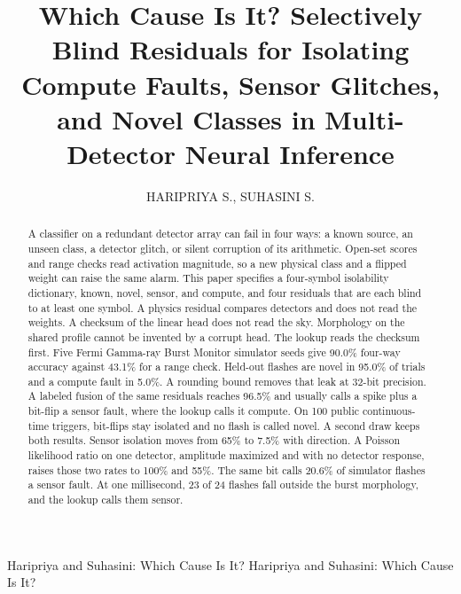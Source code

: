 \documentclass{ieeeaccess}
\begin{document}
\title{Which Cause Is It? Selectively Blind Residuals for Isolating Compute Faults, Sensor Glitches, and Novel Classes in Multi-Detector Neural Inference}

\author{\uppercase{Haripriya S.}, \uppercase{Suhasini S.}}
\address[1]{School of Computer Science and Engineering, Vellore Institute of Technology, Chennai 600127, India}
\address[2]{School of Electronics Engineering, Vellore Institute of Technology, Chennai 600127, India}

\markboth
{Haripriya and Suhasini: Which Cause Is It?}
{Haripriya and Suhasini: Which Cause Is It?}


\begin{abstract}
A classifier on a redundant detector array can fail in four ways: a known source, an unseen class, a detector glitch, or silent corruption of its arithmetic. Open-set scores and range checks read activation magnitude, so a new physical class and a flipped weight can raise the same alarm. This paper specifies a four-symbol isolability dictionary, known, novel, sensor, and compute, and four residuals that are each blind to at least one symbol. A physics residual compares detectors and does not read the weights. A checksum of the linear head does not read the sky. Morphology on the shared profile cannot be invented by a corrupt head. The lookup reads the checksum first. Five Fermi Gamma-ray Burst Monitor simulator seeds give 90.0\% four-way accuracy against 43.1\% for a range check. Held-out flashes are novel in 95.0\% of trials and a compute fault in 5.0\%. A rounding bound removes that leak at 32-bit precision. A labeled fusion of the same residuals reaches 96.5\% and usually calls a spike plus a bit-flip a sensor fault, where the lookup calls it compute. On 100 public continuous-time triggers, bit-flips stay isolated and no flash is called novel. A second draw keeps both results. Sensor isolation moves from 65\% to 7.5\% with direction. A Poisson likelihood ratio on one detector, amplitude maximized and with no detector response, raises those two rates to 100\% and 55\%. The same bit calls 20.6\% of simulator flashes a sensor fault. At one millisecond, 23 of 24 flashes fall outside the burst morphology, and the lookup calls them sensor.
\end{abstract}
\end{document}
